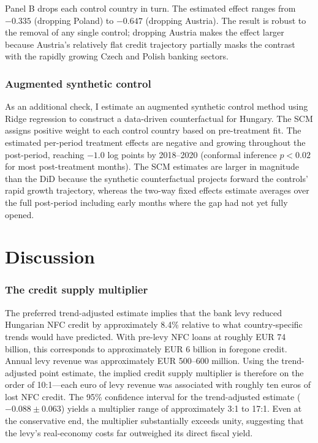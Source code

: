 \documentclass[12pt]{article}
\begin{document}
Panel B drops each control country in turn. The estimated effect ranges from $-0.335$ (dropping Poland) to $-0.647$ (dropping Austria). The result is robust to the removal of any single control; dropping Austria makes the effect larger because Austria's relatively flat credit trajectory partially masks the contrast with the rapidly growing Czech and Polish banking sectors.



\subsubsection*{Augmented synthetic control} As an additional check, I estimate an augmented synthetic control method \citep{ben2021} using Ridge regression to construct a data-driven counterfactual for Hungary. The SCM assigns positive weight to each control country based on pre-treatment fit. The estimated per-period treatment effects are negative and growing throughout the post-period, reaching $-1.0$ log points by 2018--2020 (conformal inference $p < 0.02$ for most post-treatment months). The SCM estimates are larger in magnitude than the DiD because the synthetic counterfactual projects forward the controls' rapid growth trajectory, whereas the two-way fixed effects estimate averages over the full post-period including early months where the gap had not yet fully opened.


\section{Discussion}

\subsubsection*{The credit supply multiplier} The preferred trend-adjusted estimate implies that the bank levy reduced Hungarian NFC credit by approximately 8.4\% relative to what country-specific trends would have predicted. With pre-levy NFC loans at roughly EUR 74 billion, this corresponds to approximately EUR 6 billion in foregone credit. Annual levy revenue was approximately EUR 500--600 million. Using the trend-adjusted point estimate, the implied credit supply multiplier is therefore on the order of 10:1---each euro of levy revenue was associated with roughly ten euros of lost NFC credit. The 95\% confidence interval for the trend-adjusted estimate ($-0.088 \pm 0.063$) yields a multiplier range of approximately 3:1 to 17:1. Even at the conservative end, the multiplier substantially exceeds unity, suggesting that the levy's real-economy costs far outweighed its direct fiscal yield.
\end{document}
